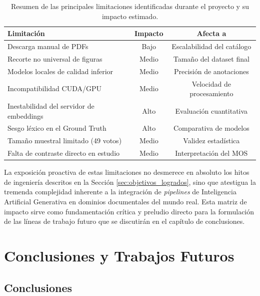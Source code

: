 \documentclass[a4paper]{report}
\begin{document}
\begin{table}[hbt!]
    \centering
    \begin{tabular}{|l|c|c|}
        \hline
        \textbf{Limitación} & \textbf{Impacto} & \textbf{Afecta a} \\ \hline
        Descarga manual de PDFs & Bajo & Escalabilidad del catálogo \\ \hline
        Recorte no universal de figuras & Medio & Tamaño del dataset final \\ \hline
        Modelos locales de calidad inferior & Medio & Precisión de anotaciones \\ \hline
        Incompatibilidad CUDA/GPU & Medio & Velocidad de procesamiento \\ \hline
        Inestabilidad del servidor de embeddings & Alto & Evaluación cuantitativa \\ \hline
        Sesgo léxico en el Ground Truth & Alto & Comparativa de modelos \\ \hline
        Tamaño muestral limitado (49 votos) & Medio & Validez estadística \\ \hline
        Falta de contraste directo en estudio & Medio & Interpretación del MOS \\ \hline
    \end{tabular}
    \caption{Resumen de las principales limitaciones identificadas durante el proyecto y su impacto estimado.}
    \label{tab:limitaciones}
\end{table}

La exposición proactiva de estas limitaciones no desmerece en absoluto los hitos de ingeniería descritos en la Sección \ref{sec:objetivos_logrados}, sino que atestigua la tremenda complejidad inherente a la integración de \textit{pipelines} de Inteligencia Artificial Generativa en dominios documentales del mundo real. Esta matriz de impacto sirve como fundamentación crítica y preludio directo para la formulación de las líneas de trabajo futuro que se discutirán en el capítulo de conclusiones.

\chapter{Conclusiones y Trabajos Futuros}
\label{sec:conclusiones}

\section{Conclusiones}
\label{sec:conclusiones_principales}
\end{document}
